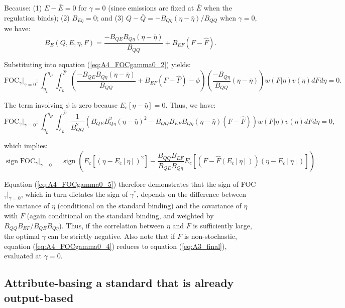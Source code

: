 \documentclass[12pt]{article}
\DeclareMathOperator{\sign}{sign}
\begin{document}
Because: (1) $E-\bar{E}=0$ for $\gamma=0$ (since emissions are fixed at $\bar{E}$ when the regulation binds); (2) $B_{E\eta}=0$; and (3) $Q-\bar{Q}=-B_{Q\eta}(\eta-\bar{\eta})/B_{QQ}$ when $\gamma=0$, we have:
\begin{equation}
B_E(Q,E,\eta,F)=\frac{-B_{QE}B_{Q\eta}(\eta-\bar{\eta})}{B_{QQ}}+B_{EF}(F-\hat{F}).
\end{equation} 

Substituting into equation (\ref{eq:A4_FOCgamma0_2}) yields:
\begin{equation}
\text{FOC}_{\gamma}|_{\gamma=0}:\int_{\eta_L}^{\eta_H}\int_{F_L}^{\hat{F}}\left(\frac{-B_{QE}B_{Q\eta}(\eta-\bar{\eta})}{B_{QQ}}+B_{EF}(F-\hat{F})-\phi\right)\left(\frac{-B_{Q\eta}}{B_{QQ}}(\eta-\bar{\eta})\right)w(F|\eta)v(\eta)dFd\eta = 0. \label{eq:A4_FOCgamma0_3}
\end{equation}

The term involving $\phi$ is zero because $E_c[\eta-\bar{\eta}]=0$. Thus, we have:
\begin{equation}
\text{FOC}_{\gamma}|_{\gamma=0}:\int_{\eta_L}^{\eta_H}\int_{F_L}^{\hat{F}}\frac{1}{B_{QQ}^2}\left(B_{QE}B_{Q\eta}^2(\eta-\bar{\eta})^2-B_{QQ}B_{EF}B_{Q\eta}(\eta-\bar{\eta})(F-\hat{F})\right)w(F|\eta)v(\eta)dFd\eta = 0, \label{eq:A4_FOCgamma0_4}
\end{equation}

which implies:
\begin{equation}
\sign{\text{FOC}_{\gamma}|_{\gamma=0}} = \sign{\left(E_c[(\eta-E_c[\eta])^2] - \frac{B_{QQ}B_{EF}}{B_{QE}B_{Q\eta}}E_c[(F-\hat{F}(E_c[\eta]))(\eta-E_c[\eta])]\right)} \label{eq:A4_FOCgamma0_5}
\end{equation}

Equation (\ref{eq:A4_FOCgamma0_5}) therefore demonstrates that the sign of FOC$_{\gamma}|_{\gamma=0}$, which in turn dictates the sign of $\gamma^*$, depends on the difference between the variance of $\eta$ (conditional on the standard binding) and the covariance of $\eta$ with $F$ (again conditional on the standard binding, and weighted by $B_{QQ}B_{EF}/B_{QE}B_{Q\eta}$). Thus, if the correlation between $\eta$ and $F$ is sufficiently large, the optimal $\gamma$ can be strictly negative. Also note that if $F$ is non-stochastic, equation (\ref{eq:A4_FOCgamma0_4}) reduces to equation (\ref{eq:A3_final}), evaluated at $\gamma=0$.


\subsection{Attribute-basing a standard that is already output-based} \label{appx:outatt}
\end{document}
